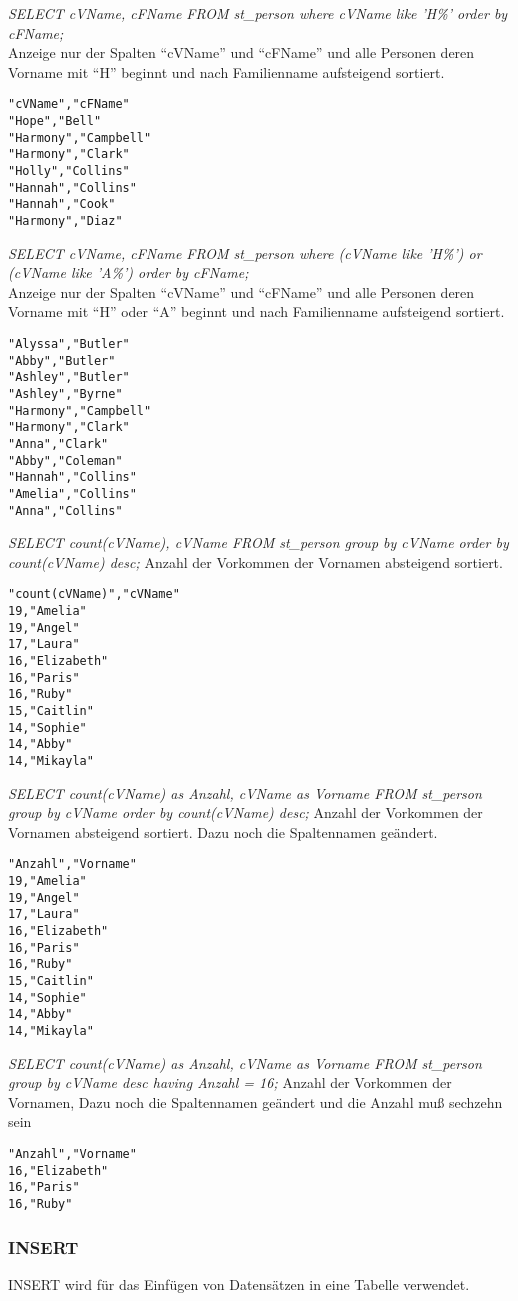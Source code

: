 \emph{SELECT cVName, cFName FROM st\_person where cVName like 'H\%' order by cFName;}\\
Anzeige nur der Spalten "`cVName"' und "`cFName"' und alle Personen deren Vorname mit "`H"' beginnt und nach Familienname aufsteigend sortiert.
\begin{verbatim}
"cVName","cFName"
"Hope","Bell"
"Harmony","Campbell"
"Harmony","Clark"
"Holly","Collins"
"Hannah","Collins"
"Hannah","Cook"
"Harmony","Diaz"
\end{verbatim}

\emph{SELECT  cVName, cFName FROM st\_person where (cVName like 'H\%') or (cVName like 'A\%') order by cFName;}\\
Anzeige nur der Spalten "`cVName"' und "`cFName"' und alle Personen deren Vorname mit "`H"' oder "`A"' beginnt und nach Familienname aufsteigend sortiert.
\begin{verbatim}
"Alyssa","Butler"
"Abby","Butler"
"Ashley","Butler"
"Ashley","Byrne"
"Harmony","Campbell"
"Harmony","Clark"
"Anna","Clark"
"Abby","Coleman"
"Hannah","Collins"
"Amelia","Collins"
"Anna","Collins"
\end{verbatim}

\emph{SELECT count(cVName), cVName FROM st\_person group by cVName order by count(cVName) desc;}
Anzahl der Vorkommen der Vornamen absteigend sortiert.
\begin{verbatim}
"count(cVName)","cVName"
19,"Amelia"
19,"Angel"
17,"Laura"
16,"Elizabeth"
16,"Paris"
16,"Ruby"
15,"Caitlin"
14,"Sophie"
14,"Abby"
14,"Mikayla"
\end{verbatim}

\emph{SELECT count(cVName) as Anzahl, cVName as Vorname FROM st\_person group by cVName order by count(cVName) desc;}
Anzahl der Vorkommen der Vornamen absteigend sortiert. Dazu noch die Spaltennamen geändert.
\begin{verbatim}
"Anzahl","Vorname"
19,"Amelia"
19,"Angel"
17,"Laura"
16,"Elizabeth"
16,"Paris"
16,"Ruby"
15,"Caitlin"
14,"Sophie"
14,"Abby"
14,"Mikayla"
\end{verbatim}

\emph{SELECT count(cVName) as Anzahl, cVName as Vorname FROM st\_person group by cVName desc having Anzahl = 16;}
Anzahl der Vorkommen der Vornamen, Dazu noch die Spaltennamen geändert und die Anzahl muß sechzehn sein
\begin{verbatim}
"Anzahl","Vorname"
16,"Elizabeth"
16,"Paris"
16,"Ruby"
\end{verbatim}

\subsubsection{INSERT}
INSERT wird für das Einfügen von Datensätzen in eine Tabelle verwendet.
